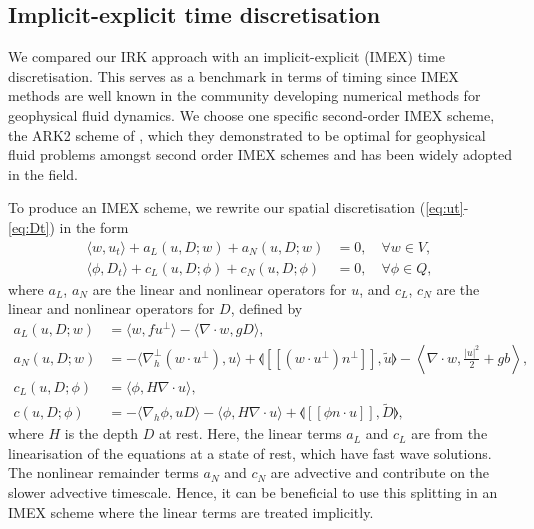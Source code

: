 \documentclass[a4paper, 12pt]{article}
\newcommand{\jump}[1]{[\![#1]\!]}
\begin{document}
\subsection{Implicit-explicit time discretisation}

We compared our IRK approach with an
implicit-explicit (IMEX) time discretisation. This serves as a
benchmark in terms of timing since IMEX methods are well known in the
community developing numerical methods for geophysical fluid dynamics.
We choose one specific second-order IMEX scheme, the ARK2 scheme
of \citet{giraldo2013implicit}, which they demonstrated to be optimal
for geophysical fluid problems amongst second order IMEX schemes and has
been widely adopted in the field.

To produce an IMEX scheme, we rewrite our spatial discretisation
(\ref{eq:ut}-\ref{eq:Dt}) in the form
\begin{align}
  \label{eq:ut IMEX}
  \langle w, u_t \rangle + a_L(u,D;w) 
  + a_N(u,D;w) 
   & = 0,
  \quad \forall w \in V, \\
  \label{eq:Dt IMEX}
  \langle \phi, D_t \rangle
+ c_L(u,D; \phi) + c_N(u,D; \phi)  & =
 0, \quad \forall \phi \in Q,
\end{align}
where $a_L$, $a_N$ are the linear and nonlinear operators for $u$,
and $c_L$, $c_N$ are the linear and nonlinear operators for $D$,
defined by
\begin{align}
  a_L(u,D;w) & = \langle w, fu^\perp \rangle - \langle \nabla\cdot w,
  gD \rangle, \\
   a_N(u,D;w) 
&=
  - \langle \nabla_h^\perp (w\cdot u^\perp), u \rangle
  + \llangle \jump{(w\cdot u^\perp) n^\perp}, \tilde{u} \rrangle  - \left\langle \nabla\cdot w, \frac{|u|^2}{2} + gb \right\rangle, \\
  c_L(u,D;\phi) & = \langle \phi, H\nabla\cdot u\rangle, \\
  c(u,D; \phi) &=
  - \langle \nabla_h \phi, uD \rangle
  - \langle \phi, H\nabla\cdot u\rangle
  + \llangle \jump{\phi n\cdot u}, \tilde{D} \rrangle,
\end{align}
where $H$ is the depth $D$ at rest. Here, the linear terms $a_L$ and
$c_L$ are from the linearisation of the equations at a state of rest,
which have fast wave solutions.  The nonlinear remainder terms $a_N$
and $c_N$ are advective and contribute on the slower advective
timescale. Hence, it can be beneficial to use this splitting in an
IMEX scheme where the linear terms are treated implicitly.
\end{document}
